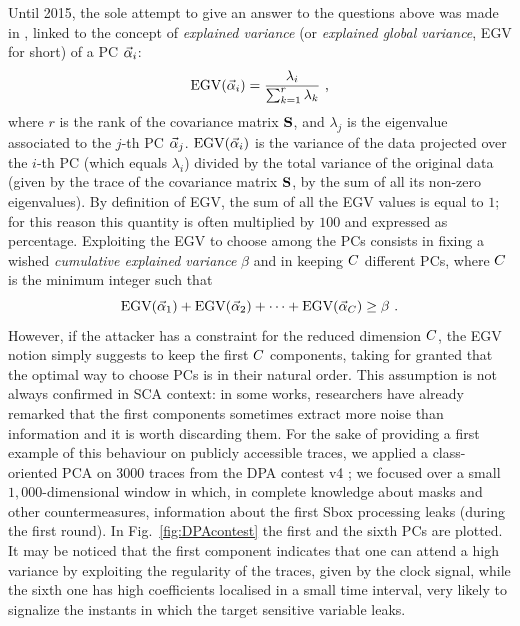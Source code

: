 Until 2015, the sole attempt to give an answer to the questions above was made in \cite{choudary2014efficient}, linked to the concept of {\em explained variance} (or {\em explained global variance}, EGV for short) of a PC $\vec{\alpha}_i$:
\begin{equation}\label{eq:EGV}
\mathrm{EGV}(\vec{\alpha}_i) =  \frac{\lambda_i}{\sum_{k=1}^r\lambda_k} \mbox{ ,}
\end{equation}
where $r$ is the rank of the covariance matrix $\textbf{S}$, and $\lambda_j$ is the eigenvalue associated to the $j$-th PC $\vec{\alpha}_j$. $\mathrm{EGV}(\vec{\alpha}_i)$ is the variance of the data projected over the $i$-th PC (which equals $\lambda_i$) divided by the total variance of the original data (given by the trace of the covariance matrix $\textbf{S}$, \ie by the sum of all its non-zero eigenvalues). By definition of EGV, the sum of all the EGV values is equal to $1$; for this reason this quantity is often multiplied by $100$ and expressed as percentage.
Exploiting the EGV to choose among the PCs consists in fixing a wished {\em cumulative explained variance} $\beta$ and in keeping $C$ different PCs, where $C$ is the minimum integer such that
\begin{equation}
\mbox{EGV}(\vec{\alpha}_1) +\mbox{EGV}(\vec{\alpha}_2) + \dots +\mbox{EGV}(\vec{\alpha}_C) \geq \beta \mbox{ .}
\end{equation}
However, if the attacker has a constraint for the reduced dimension $C$, the EGV notion simply suggests to keep the first $C$ components, taking for granted that the optimal way to choose PCs is in their natural order. This assumption is not always confirmed in SCA context: in some works, researchers have already remarked that the first components sometimes extract more noise than information \cite{Batina2012,specht} and it is worth discarding them. For the sake of providing a first example of this behaviour on publicly accessible traces, we applied a class-oriented PCA on 3000 traces from the DPA contest v4 \cite{DPAcontest}; we focused over a small $1,000$-dimensional window in which, in complete knowledge about masks and other countermeasures, information about the first Sbox processing leaks (during the first round). In Fig.~\ref{fig:DPAcontest} the first and the sixth PCs are plotted. It may be noticed that the first component indicates that one can attend a high variance by exploiting the regularity of the traces, given by the clock signal, while the sixth one has high coefficients localised in a small time interval, very likely to signalize the instants in which the target sensitive variable leaks.\\


